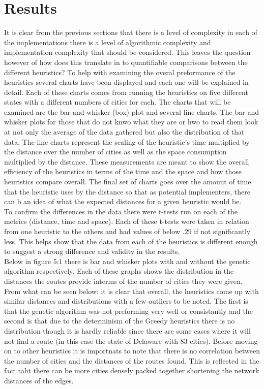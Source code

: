 \documentclass[midd]{thesis}
\newcommand{\tab}{\hspace*{2em}}
\begin{document}
\chapter{Results}
\tab It is clear from the previous sections that there is a level of complexity in each of the implementations there is a level of algorithmic complexity and implementation complexity that should be considered. This leaves the question however of how does this translate in to quantifiable comparisons between the different heuristics? To help with examining the overal preformance of the heuristics several charts have been displayed and each one will be explained in detail. Each of these charts comes from running the heuristics on five different states with a different numbers of cities for each. The charts that will be examined are the bar-and-whisker (box) plot and several line charts. The bar and whisker plots for those that do not knwo what they are or hwo to read them look at not only the average of the data gathered but also the distribution of that data. The line charts represent the scaling of the heuristic's time multiplied by the distance over the number of cities as well as the space consumption multiplied by the distance. These measurements are meant to show the overall efficiency of the heuristics in terms of the time and the space and how those heuristics compare overall. The final set of charts goes over the amount of time that the heuristic uses by the distance so that as potential implementers, there can b an idea of what the expected distances for a given heuristic would be.\\
\tab To confirm the differences in the data there were t-tests run on each of the metrics (distance, time and space). Each of these t-tests were taken in relation from one heuristic to the others and had values of below $.29$ if not significantly less. This helps show that the data from each of the heuristics is different enough to suggest a strong difference and validity in the results.\\
\tab Below in figure 5:1 there is bar and whisker plots with and without the genetic algorithm respectively. Each of these graphs shows the distribution in the distances the routes provide interms  of the number of cities they were given.  From what can be seen below: it is clear that overall, the heuristics come up with similar distances and distributions with a few outliers to be noted. The first is that the genetic algorithm was not preforming very well or consistantly and the second is that due to the determinism of the Greedy heuristics there is no distribution though it is hardly reliable since there are some cases where it will not find a route (in this case the state of Delaware with 83 cities). Before moving on to other heuristics it is importnats to note that there is no correlation between the number of cities and the distances of the routes found. This is reflected in the fact taht there can be more cities densely packed together shortening the network distances of the edges.\\
\end{document}
